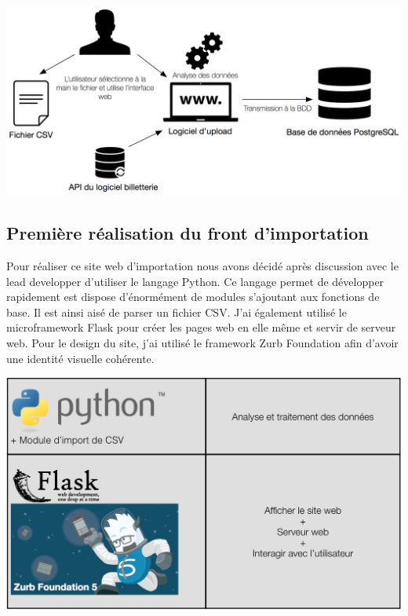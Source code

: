 \begin{center}
\includegraphics[scale=0.57]{images/datafit.png}
\label{interface_upload}
\end{center}


\subsection{Première réalisation du front d'importation}

Pour réaliser ce site web d'importation nous avons décidé après discussion avec le lead developper d'utiliser le langage Python. Ce langage permet de développer rapidement est dispose d'énormément de modules s'ajoutant aux fonctions de base. Il est ainsi aisé de parser un fichier CSV. J'ai également utilisé le microframework Flask pour créer les pages web en elle même et servir de serveur web. Pour le design du site, j'ai utilisé le framework Zurb Foundation afin d'avoir une identité visuelle cohérente. 

\begin{center}
\includegraphics[scale=0.6]{images/datafit2.png}
\label{interface_upload_tech}
\end{center}

